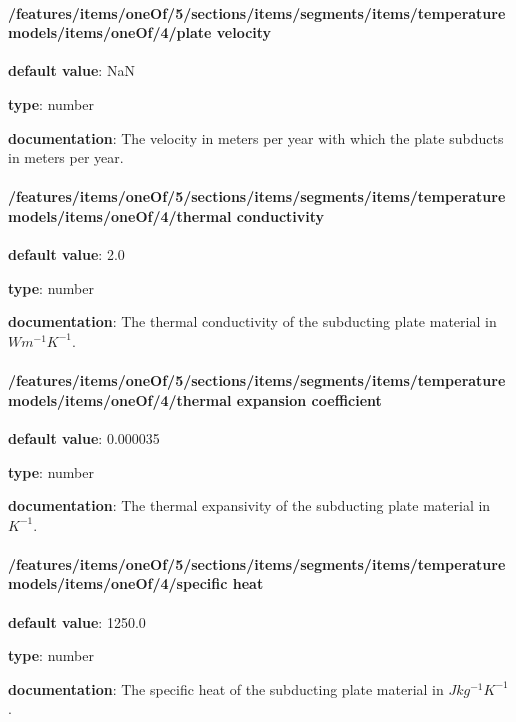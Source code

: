 \begin{itemized}
\end{itemized}\paragraph{/features/items/oneOf/5/sections/items/segments/items/temperature models/items/oneOf/4/plate velocity} \begin{itemized}
\item {\bf default value}: NaN
\item {\bf type}: number
\item {\bf documentation}: The velocity in meters per year with which the plate subducts in meters per year.
\end{itemized}\paragraph{/features/items/oneOf/5/sections/items/segments/items/temperature models/items/oneOf/4/thermal conductivity} \begin{itemized}
\item {\bf default value}: 2.0
\item {\bf type}: number
\item {\bf documentation}: The thermal conductivity of the subducting plate material in $W m^{-1} K^{-1}$.
\end{itemized}\paragraph{/features/items/oneOf/5/sections/items/segments/items/temperature models/items/oneOf/4/thermal expansion coefficient} \begin{itemized}
\item {\bf default value}: 0.000035
\item {\bf type}: number
\item {\bf documentation}: The thermal expansivity of the subducting plate material in $K^{-1}$.
\end{itemized}\paragraph{/features/items/oneOf/5/sections/items/segments/items/temperature models/items/oneOf/4/specific heat} \begin{itemized}
\item {\bf default value}: 1250.0
\item {\bf type}: number
\item {\bf documentation}: The specific heat of the subducting plate material in $J kg^{-1} K^{-1}$.

\end{itemized}
